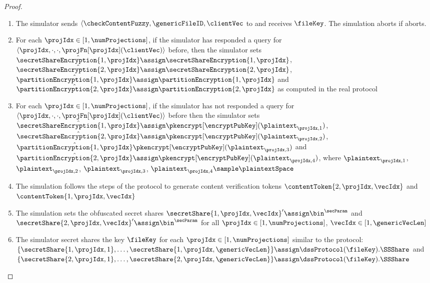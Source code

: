 \begin{proof}
\begin{enumerate}
\item The simulator sends $\langle \checkContentFuzzy, \genericFileID, \clientVec$ to \contentModFunc and receives $\fileKey$. The simulation aborts if \contentModFunc aborts. 

\item For each $\projIdx \in [1, \numProjections]$, if the simulator has responded a \primeRO query for $\langle \projIdx, \cdot, \cdot, \projFn[\projIdx](\clientVec) \rangle$ before, then the simulator sets $\hat{\secretShareEncryption{1, \projIdx}} \assign  \secretShareEncryption{1, \projIdx}$, $\hat{\secretShareEncryption{2, \projIdx}} \assign  \secretShareEncryption{2, \projIdx}$, 
$\hat{\partitionEncryption{1, \projIdx}} \assign \partitionEncryption{1, \projIdx}$ and $\hat{\partitionEncryption{2, \projIdx}} \assign \partitionEncryption{2, \projIdx}$ as computed in the real protocol 

\item For each $\projIdx \in [1, \numProjections]$, if the simulator has not responded a \primeRO query for $\langle \projIdx, \cdot, \cdot, \projFn[\projIdx](\clientVec) \rangle$ before then the simulator sets $\hat{\secretShareEncryption{1, \projIdx}} \assign  \pkencrypt[\encryptPubKey](\plaintext_{\projIdx, 1})$, $\hat{\secretShareEncryption{2, \projIdx}} \assign  \pkencrypt[\encryptPubKey](\plaintext_{\projIdx, 2})$, 
$\hat{\partitionEncryption{1, \projIdx}}\pkencrypt[\encryptPubKey](\plaintext_{\projIdx, 3})$ and $\hat{\partitionEncryption{2, \projIdx}} \assign \pkencrypt[\encryptPubKey](\plaintext_{\projIdx, 4})$, where $\plaintext_{\projIdx, 1}$, $\plaintext_{\projIdx, 2}$, $\plaintext_{\projIdx, 3}$, $\plaintext_{\projIdx, 4} \sample \plaintextSpace$ 


\item The simulation follows the steps of the protocol to generate content verification tokens $\contentToken{2, \projIdx, \vecIdx}$ and $\contentToken{1, \projIdx, \vecIdx}$

\item The simulation sets the obfuscated secret shares $\secretShare{1, \projIdx, \vecIdx}' \assign \bin^{\secParam}$ and $\secretShare{2, \projIdx, \vecIdx}' \assign \bin^{\secParam}$ for all $\projIdx \in [1, \numProjections]$, $\vecIdx \in [1, \genericVecLen]$

\item The simulator secret shares the key $\fileKey$ for each $\projIdx \in [1, \numProjections]$ similar to the protocol: $\{ \secretShare{1, \projIdx, 1}, \dots, \secretShare{1, \projIdx, \genericVecLen} \} \assign \dssProtocol(\fileKey).\SSShare$ and 
$\{ \secretShare{2, \projIdx, 1}, \dots, \secretShare{2, \projIdx, \genericVecLen} \} \assign \dssProtocol(\fileKey).\SSShare$


\end{enumerate}
\end{proof}
